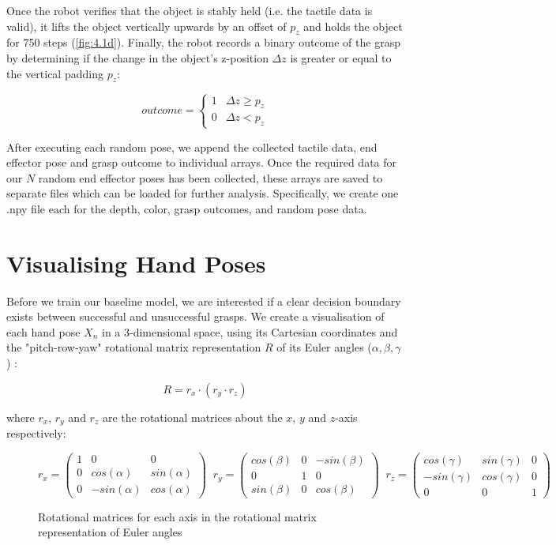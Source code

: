 \documentclass[11pt, a4paper]{report}
\theoremstyle{definition}
\begin{document}
Once the robot verifies that the object is stably held (i.e. the tactile data is valid), it lifts the object vertically upwards by an offset of $p_z$ and holds the object for 750 steps (\ref{fig:4.1d}). Finally, the robot records a binary outcome of the grasp by determining if the change in the object's z-position $\Delta z$ is greater or equal to the vertical padding $p_z$:

\begin{equation}
    outcome=\begin{cases}1 & \Delta z\geq p_z \\ 0 & \Delta z<p_z\end{cases}
\end{equation}

After executing each random pose, we append the collected tactile data, end effector pose and grasp outcome to individual arrays. Once the required data for our $N$ random end effector poses has been collected, these arrays are saved to separate files which can be loaded for further analysis. Specifically, we create one .npy file each for the depth, color, grasp outcomes, and random pose data.


\newpage
\section{Visualising Hand Poses}
\label{sec:4.3}
Before we train our baseline model, we are interested if a clear decision boundary exists between successful and unsuccessful grasps. We create a visualisation of each hand pose $X_n$ in a 3-dimensional space, using its Cartesian coordinates and the "pitch-row-yaw" rotational matrix representation $R$ of its Euler angles ($\alpha,\beta,\gamma$) \cite{weisstein}:

\begin{equation}
    R=r_x\cdot(r_y\cdot r_z)
\end{equation}

\noindent where $r_x$, $r_y$ and $r_z$ are the rotational matrices about the $x$, $y$ and $z$-axis respectively:

\begin{figure}[H]
    \centering
    \begin{equation*}
        r_x = \begin{pmatrix}1&0&0 \\ 0&cos(\alpha)&sin(\alpha) \\ 0&-sin(\alpha)&cos(\alpha)\end{pmatrix}\;\;
        r_y = \begin{pmatrix}cos(\beta)&0&-sin(\beta) \\ 0&1&0 \\ sin(\beta)&0&cos(\beta)\end{pmatrix}\;\;
        r_z = \begin{pmatrix}cos(\gamma)&sin(\gamma)&0 \\ -sin(\gamma)&cos(\gamma)&0 \\ 0&0&1 \end{pmatrix}
    \end{equation*}
    \caption{Rotational matrices for each axis in the rotational matrix representation of Euler angles}
    \label{fig:4.3}
\end{figure}
\end{document}
